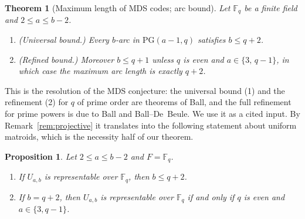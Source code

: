 \documentclass{amsart}
\newtheorem{theorem}{Theorem}
\newtheorem{proposition}{Proposition}
\theoremstyle{definition}
\begin{document}
\begin{theorem}[Maximum length of MDS codes; arc bound]\label{thm:mds}
Let $\mathbb F_q$ be a finite field and $2\le a\le b-2$.
\begin{enumerate}
\item \emph{(Universal bound.)} Every $b$-arc in $\mathrm{PG}(a-1,q)$ satisfies
$b\le q+2$.
\item \emph{(Refined bound.)} Moreover $b\le q+1$ unless $q$ is even and
$a\in\{3,\,q-1\}$, in which case the maximum arc length is exactly $q+2$.
\end{enumerate}
\end{theorem}

This is the resolution of the MDS conjecture: the universal bound (1) and the
refinement (2) for $q$ of prime order are theorems of Ball, and the full
refinement for prime powers is due to Ball and Ball--De~Beule. We use it as a
cited input. By Remark~\ref{rem:projective} it translates into the following
statement about uniform matroids, which is the necessity half of our theorem.

\begin{proposition}\label{prop:nec}
Let $2\le a\le b-2$ and $F=\mathbb F_q$.
\begin{enumerate}
\item If $U_{a,b}$ is representable over $\mathbb F_q$, then $b\le q+2$.
\item If $b=q+2$, then $U_{a,b}$ is representable over $\mathbb F_q$ if and only
if $q$ is even and $a\in\{3,q-1\}$.
\end{enumerate}
\end{proposition}
\end{document}
